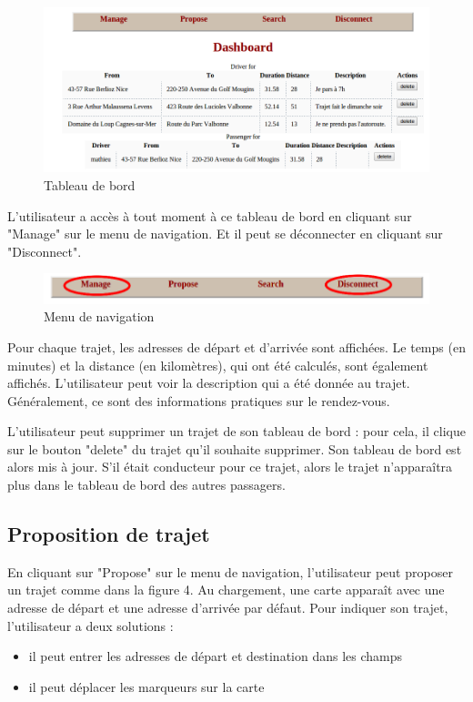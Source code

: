 \documentclass[a4paper]{article}
\begin{document}
\begin{figure}[!ht]
	\centering
	\includegraphics[scale=0.5]{Dashboard.png}
	\caption{\label{dashboard} Tableau de bord}
\end{figure}

L'utilisateur a accès à tout moment à ce tableau de bord en cliquant sur "Manage" sur le menu de navigation. Et il peut se déconnecter en cliquant sur "Disconnect".

\begin{figure}[!ht]
	\centering
	\includegraphics[scale=0.4]{Menu.png}
	\caption{\label{menu} Menu de navigation}
\end{figure}

Pour chaque trajet, les adresses de départ et d'arrivée sont affichées. Le temps (en minutes) et la distance (en kilomètres), qui ont été calculés, sont également affichés. L'utilisateur peut voir la description qui a été donnée au trajet. Généralement, ce sont des informations pratiques sur le rendez-vous.

L'utilisateur peut supprimer un trajet de son tableau de bord : pour cela, il clique sur le bouton "delete" du trajet qu'il souhaite supprimer.
Son tableau de bord est alors mis à jour. S'il était conducteur pour ce trajet, alors le trajet n'apparaîtra plus dans le tableau de bord des autres passagers. 

\subsection{Proposition de trajet}

En cliquant sur "Propose" sur le menu de navigation, l'utilisateur peut proposer un trajet comme dans la figure 4. Au chargement, une carte apparaît avec une adresse
de départ et une adresse d'arrivée par défaut. Pour indiquer son trajet, l'utilisateur a deux solutions :
\begin{itemize}
	\item il peut entrer les adresses de départ et destination dans les champs
	\item il peut déplacer les marqueurs sur la carte
\end{itemize}
\end{document}
